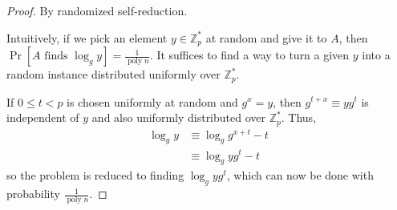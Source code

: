 \documentclass[letterpaper,11pt]{article}
\DeclareMathOperator{\PrOp}{Pr}
\DeclareMathOperator{\poly}{poly}
\renewcommand{\Pr}[1]{\PrOp{\left[\text{#1}\right]}}
\newcommand{\Z}{\mathbb{Z}}
\begin{document}
\begin{proof} By randomized self-reduction.

    Intuitively, if we pick an element $y \in \Z_p^*$ at random and give it to
    $A$, then $\Pr{$A$ finds $\log_g y$} = \frac{1}{\poly n}$. It
    suffices to find a way to turn a given $y$ into a random instance
    distributed uniformly over $\Z_p^*$.

    If $0 \leq t < p$ is chosen uniformly at random and $g^x = y$, then
    $g^{t+x} \equiv yg^t$ is independent of $y$ and also uniformly distributed
    over $\Z_p^*$. Thus,
    \begin{align*}
        \log_g y
            &\equiv \log_g{g^{x+t}} - t \\
            &\equiv \log_g{yg^t} - t
    \end{align*}
    so the problem is reduced to finding $\log_g{yg^t}$, which can now be done
    with probability $\frac{1}{\poly n}$.
\end{proof}
\end{document}
